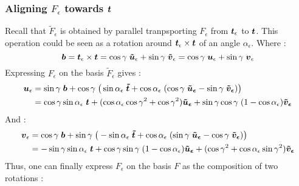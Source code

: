 \subsubsection{Aligning $F_\epsilon$ towards $\boldsymbol{t}$}

Recall that $\tilde{F}_\epsilon$ is obtained by parallel tranpsporting $F_\epsilon$ from $\boldsymbol{t}_\epsilon$ to $\boldsymbol{t}$. This operation could be seen as a rotation around $\boldsymbol{t}_\epsilon \times \boldsymbol{t}$ of an angle $\alpha_\epsilon$. Where :
\begin{equation}
	\boldsymbol{b} = \boldsymbol{t}_\epsilon \times \boldsymbol{t} 
	 = \cos{\gamma}\;\boldsymbol{\tilde{u}}_\epsilon + \sin{\gamma}\;\boldsymbol{\tilde{v}}_\epsilon
	 = \cos{\gamma}\;\boldsymbol{u}_\epsilon + \sin{\gamma}\;\boldsymbol{v}_\epsilon
\end{equation}
Expressing $F_\epsilon$ on the basis $\tilde{F}_\epsilon$ gives :
\begin{equation}
	\begin{aligned}
	\boldsymbol{u}_\epsilon &= \sin{\gamma}\;\boldsymbol{b} + \cos{\gamma}\;\big(\sin{\alpha_\epsilon}\;\boldsymbol{\tilde{t}}
	+ \cos{\alpha_\epsilon}\;(\cos{\gamma}\;\boldsymbol{\tilde{u}_\epsilon} 
	- \sin{\gamma}\;\boldsymbol{\tilde{v}_\epsilon})\big) \\
	&=\cos{\gamma}\sin{\alpha_\epsilon}\;\boldsymbol{t}
	+ (\cos{\alpha_\epsilon}\cos{\gamma}^2+ \cos{\gamma}^2)\boldsymbol{\tilde{u}_\epsilon} 
	+ \sin{\gamma}\cos{\gamma}\;(1-\cos{\alpha_\epsilon})\boldsymbol{\tilde{v}_\epsilon} 
	\end{aligned}
\end{equation}
And :
\begin{equation}
	\begin{aligned}
	\boldsymbol{v}_\epsilon &= \cos{\gamma}\;\boldsymbol{b} + \sin{\gamma}\;\big(-\sin{\alpha_\epsilon}\;\boldsymbol{\tilde{t}}
	+ \cos{\alpha_\epsilon}\;(\sin{\gamma}\;\boldsymbol{\tilde{u}_\epsilon} 
	- \cos{\gamma}\;\boldsymbol{\tilde{v}_\epsilon})\big) \\
	&=-\sin{\gamma}\sin{\alpha_\epsilon}\;\boldsymbol{t}
	+ \cos{\gamma}\sin{\gamma}\;(1-\cos{\alpha_\epsilon})\boldsymbol{\tilde{u}_\epsilon} 
	+ (\cos{\gamma}^2 + \cos{\alpha_\epsilon}\sin{\gamma}^2)\boldsymbol{\tilde{v}_\epsilon} 
	\end{aligned}
\end{equation}
Thus, one can finally express $F_\epsilon$ on the basis $F$ as the composition of two rotations :
